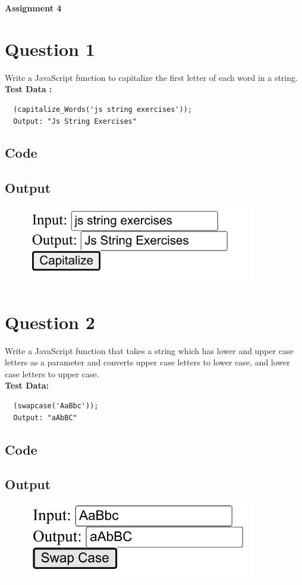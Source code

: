 \documentclass{article}
\begin{document}
{\centerline{\bfseries \Huge Assignment 4}}

\section*{Question 1}
Write a JavaScript function to capitalize the first letter of each word in a string. \\
\textbf{Test Data :}
\begin{lstlisting}
  (capitalize_Words('js string exercises'));
  Output: "Js String Exercises"
\end{lstlisting}
\subsection*{Code}

\newpage
\subsection*{Output}
\begin{figure}[H]
  \centering
  \includegraphics[width=10cm]{1/out.png}
\end{figure}

\newpage
\section*{Question 2}
Write a JavaScript function that takes a string which has lower and
upper case letters as a parameter and converts upper case letters to
lower case, and lower case letters to upper case. \\
\textbf{Test Data:}
\begin{lstlisting}
  (swapcase('AaBbc'));
  Output: "aAbBC"
\end{lstlisting}
\subsection*{Code}

\newpage
\subsection*{Output}
\begin{figure}[H]
  \centering
  \includegraphics[width=10cm]{2/out.png}
\end{figure}
\end{document}
